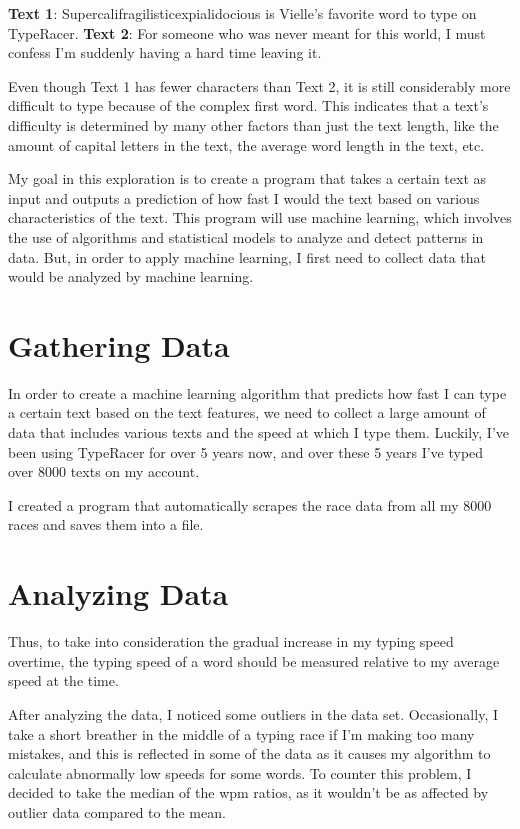 \documentclass[12pt]{article}
\newenvironment{textexamples}
  {\medskip\par\setlength{\parindent}{0pt}}
  {\par\medskip}
\begin{document}
\begin{textexamples}
	\textbf{Text 1}: Supercalifragilisticexpialidocious is Vielle's favorite word to type on TypeRacer.
	\textbf{Text 2}: For someone who was never meant for this world, I must confess I'm suddenly having a hard time leaving it.
\end{textexamples}

Even though Text 1 has fewer characters than Text 2, it is still considerably more difficult to type because of the complex first word. This indicates that a text's difficulty is determined by many other factors than just the text length, like the amount of capital letters in the text, the average word length in the text, etc.

My goal in this exploration is to create a program that takes a certain text as input and outputs a prediction of how fast I would the text based on various characteristics of the text. This program will use machine learning, which involves the use of algorithms and statistical models to analyze and detect patterns in data. But, in order to apply machine learning, I first need to collect data that would be analyzed by machine learning.

\section*{Gathering Data}

In order to create a machine learning algorithm that predicts how fast I can type a certain text based on the text features, we need to collect a large amount of data that includes various texts and the speed at which I type them. Luckily, I've been using TypeRacer for over 5 years now, and over these 5 years I've typed over 8000 texts on my account.

I created a program that automatically scrapes the race data from all my 8000 races and saves them into a file.


\section*{Analyzing Data}

Thus, to take into consideration the gradual increase in my typing speed overtime, the typing speed of a word should be measured relative to my average speed at the time.

After analyzing the data, I noticed some outliers in the data set. Occasionally, I take a short breather in the middle of a typing race if I'm making too many mistakes, and this is reflected in some of the data as it causes my algorithm to calculate abnormally low speeds for some words. To counter this problem, I decided to take the median of the wpm ratios, as it wouldn't be as affected by outlier data compared to the mean.
\end{document}

